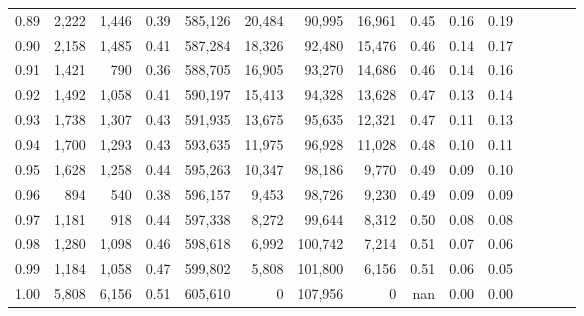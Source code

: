 \begin{tabular}{rrrcrrrrrrrrrrr}
0.89 &   2,222 &  1,446 &                                       0.39 &  585,126 &   20,484 &   90,995 &   16,961 &  0.45 &  0.16 &                         0.19 \\
0.90 &   2,158 &  1,485 &                                       0.41 &  587,284 &   18,326 &   92,480 &   15,476 &  0.46 &  0.14 &                         0.17 \\
0.91 &   1,421 &    790 &                                       0.36 &  588,705 &   16,905 &   93,270 &   14,686 &  0.46 &  0.14 &                         0.16 \\
0.92 &   1,492 &  1,058 &                                       0.41 &  590,197 &   15,413 &   94,328 &   13,628 &  0.47 &  0.13 &                         0.14 \\
0.93 &   1,738 &  1,307 &                                       0.43 &  591,935 &   13,675 &   95,635 &   12,321 &  0.47 &  0.11 &                         0.13 \\
0.94 &   1,700 &  1,293 &                                       0.43 &  593,635 &   11,975 &   96,928 &   11,028 &  0.48 &  0.10 &                         0.11 \\
0.95 &   1,628 &  1,258 &                                       0.44 &  595,263 &   10,347 &   98,186 &    9,770 &  0.49 &  0.09 &                         0.10 \\
0.96 &     894 &    540 &                                       0.38 &  596,157 &    9,453 &   98,726 &    9,230 &  0.49 &  0.09 &                         0.09 \\
0.97 &   1,181 &    918 &                                       0.44 &  597,338 &    8,272 &   99,644 &    8,312 &  0.50 &  0.08 &                         0.08 \\
0.98 &   1,280 &  1,098 &                                       0.46 &  598,618 &    6,992 &  100,742 &    7,214 &  0.51 &  0.07 &                         0.06 \\
0.99 &   1,184 &  1,058 &                                       0.47 &  599,802 &    5,808 &  101,800 &    6,156 &  0.51 &  0.06 &                         0.05 \\
1.00 &   5,808 &  6,156 &                                       0.51 &  605,610 &        0 &  107,956 &        0 &   nan &  0.00 &                         0.00 \\
\bottomrule
\end{tabular}
